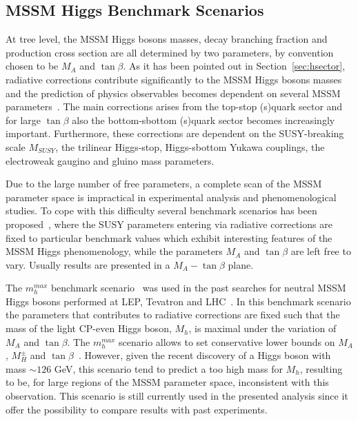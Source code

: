 \subsection{MSSM Higgs Benchmark Scenarios}
At tree level, the MSSM  Higgs bosons masses, decay branching fraction and production cross section are all determined by two parameters,
by convention chosen to be $M_A$ and $\tan\beta$. As it has been pointed out in Section~\ref{sec:hsector}, radiative corrections
contribute significantly to the MSSM Higgs bosons masses and the prediction of physics observables becomes 
dependent on several MSSM parameters~\cite{Higgsm5}.
The main corrections arises from the top-stop (s)quark sector and for large $\tan\beta$ also the bottom-sbottom (s)quark sector becomes increasingly 
important. Furthermore, these corrections are dependent on the SUSY-breaking scale $M_{SUSY}$, the trilinear Higgs-stop, 
Higgs-sbottom Yukawa couplings, the electroweak gaugino and gluino mass parameters.

Due to the large number of free parameters, a complete scan of the MSSM parameter space is impractical in experimental analysis and phenomenological
studies. To cope with this difficulty several benchmark scenarios has been proposed~\cite{LHCxsec,mhmax2}, where the SUSY parameters
 entering via radiative corrections 
are fixed to particular benchmark values which exhibit interesting features of the MSSM Higgs phenomenology, while the parameters 
$M_A$ and $\tan\beta$ are left free to vary. Usually results are presented in a $M_A-\tan\beta$ plane.

The $m_h^{max}$ benchmark scenario~\cite{MSSMmhmax} was  used in the past searches for neutral MSSM Higgs bosons performed
at LEP, Tevatron and LHC~\cite{LEPLimits,TevatronLimits1,CMSLimit,ATLASLimit}. 
In this benchmark scenario the parameters that contributes to 
radiative corrections are fixed such that the mass of the light CP-even Higgs boson, 
$M_h$, is maximal under the variation of $M_A$ and $\tan\beta$. The $m_h^{max}$ scenario allows to set conservative 
lower bounds on $M_A$, $M_H^{\pm}$ and $\tan\beta$~\cite{mhmax2}. However, given the recent discovery of a Higgs
boson with mass $\sim 126$ GeV, this scenario
tend to predict a too high mass for $M_h$, resulting to be, for large regions of the MSSM parameter space, 
inconsistent with this observation. This scenario is still currently used in the presented analysis since it offer the possibility to
compare results with past experiments. 


